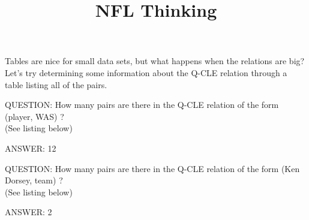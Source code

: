 \documentclass{ximera}
\title{NFL Thinking}
\begin{document}
\begin{abstract}
\end{abstract}

\maketitle

Tables are nice for small data sets, but what happens when the relations are big?  Let's try determining some information about the Q-CLE relation through a table listing all of the pairs.


\begin{dialogue}
\item[QUESTION:] How many pairs are there in the Q-CLE relation of the form (player, WAS) ? \\
(See listing below)
\item[ANSWER:] 12 \\
\end{dialogue}



\begin{dialogue}
\item[QUESTION:] How many pairs are there in the Q-CLE relation of the form (Ken Dorsey, team) ? \\
(See listing below)
\item[ANSWER:] 2 \\
\end{dialogue}
\end{document}
